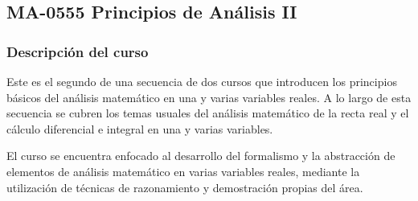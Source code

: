 \newpage
\subsection*{MA-0555 Principios de Análisis II}

\hypertarget{MA0555}{}
\begin{refsection}
\begin{table}[H]
\end{table}



\subsubsection*{Descripción del curso}



Este es el segundo de una secuencia de dos cursos que introducen los principios básicos del análisis matemático en una y varias variables reales. A lo largo de esta secuencia se cubren los temas usuales del análisis matemático
de la recta real y el cálculo diferencial e integral en una y varias variables. 

El curso se encuentra enfocado al desarrollo del formalismo y la abstracción de elementos de análisis matemático en varias variables reales, mediante la utilización de técnicas de razonamiento y demostración propias del área.


\end{refsection}
